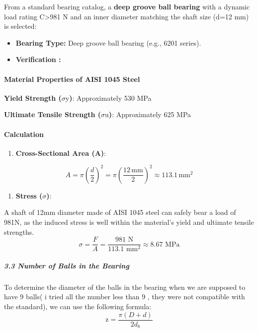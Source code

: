 \documentclass[../../main]{subfiles}
\begin{document}
From a standard bearing catalog, a \textbf{deep groove ball bearing}
with a dynamic load rating C\textgreater981 N and an inner diameter
matching the shaft size (d=12 mm) is selected:

\begin{itemize}
\item
  \textbf{Bearing Type:} Deep groove ball bearing (e.g., 6201 series).
\item
  \textbf{Verification :}
\end{itemize}

\paragraph{Material Properties of AISI 1045 Steel}

\textbf{Yield Strength (}$\sigma$y\textbf{)}: Approximately 530 MPa

\textbf{Ultimate Tensile Strength (}$\sigma$u\textbf{)}: Approximately 625 MPa

\paragraph{Calculation}

\begin{enumerate}
\def\labelenumi{\arabic{enumi}.}
\item
  \textbf{Cross-Sectional Area (A)}:
\end{enumerate}


$$A=\pi\left(\frac{d}{2}\right)^2=\pi\left(\frac{12\, \text{mm}}{2}\right)^2 \approx 113.1\, \text{mm}^2$$

\begin{enumerate}
\def\labelenumi{\arabic{enumi}.}
\setcounter{enumi}{1}
\item
  \textbf{Stress (}$\sigma$\textbf{)}:
\end{enumerate}


A shaft of 12mm diameter made of AISI 1045 steel can safely bear a load of 981N, as the induced stress is well within the material's yield and ultimate tensile strengths.
$$
\sigma = \frac{F}{A} = \frac{981 \text{ N}}{113.1 \text{ mm}^2} \approx 8.67 \text{ MPa}
$$

\subparagraph{3.3 Number of Balls in the Bearing}

To determine the diameter of the balls in the bearing when we are
supposed to have 9 balls( i tried all the number less than 9 , they were
not compatible with the standard), we can use the following formula:
\begin{equation}
  \text{z} = \frac{\pi (D + d)}{2 d_b}
  \label{eq4}
\end{equation}
\end{document}
